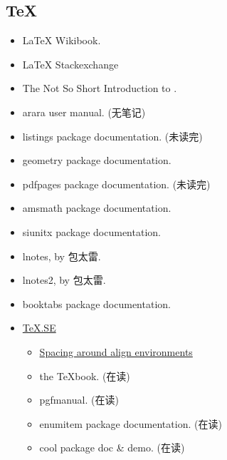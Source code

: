 \documentclass{article}
\begin{document}
\subsection{TeX}
\begin{itemize}
    \item \LaTeX{} Wikibook.
    \item \LaTeX{} Stackexchange
    \item The Not So Short Introduction to \LaTeXe{}.
    \item arara user manual. (无笔记)
    \item listings package documentation. (未读完)
    \item geometry package documentation.
    \item pdfpages package documentation. (未读完)
    \item amsmath package documentation.
    \item siunitx package documentation.
    \item lnotes, by 包太雷.
    \item lnotes2, by 包太雷.
    \item booktabs package documentation.
    \item \href{http://tex.stackexchange.com/}{TeX.SE}
        \begin{itemize}
            \item \href{http://tex.stackexchange.com/questions/198613/spacing-around-align-environments}{Spacing around align environments}
            \item the TeXbook. (在读)
            \item pgfmanual. (在读)
            \item enumitem package documentation. (在读)
            \item cool package doc \& demo. (在读)
        \end{itemize}
\end{itemize}
\end{document}
